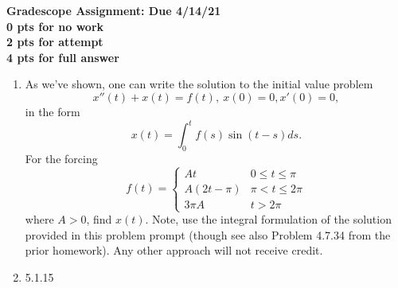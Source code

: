 \documentclass[a4paper,11pt]{article}
\newcommand{\ba}{\begin{array}}
\newcommand{\ea}{\end{array}}
\begin{document}
\begin{center}
{\bf Gradescope Assignment: Due 4/14/21\\
0 pts for no work\\ 2 pts for attempt\\ 4 pts for full answer}
\end{center}
\begin{enumerate}
\item As we've shown, one can write the solution to the initial value problem 
\[
x''(t) + x(t) = f(t), ~ x(0)=0, x'(0)=0,
\]
in the form
\[
x(t) = \int_{0}^{t}f(s)\sin(t-s)ds.
\]
For the forcing 
\[
f(t) = \left\{
\ba{rl}
At & 0\leq t \leq \pi \\
A(2t-\pi) & \pi < t \leq 2\pi\\
3\pi A & t > 2\pi
\ea
\right.
\]
where $A>0$, find $x(t)$.  Note, use the integral formulation of the solution provided in this problem prompt (though see also Problem 4.7.34 from the prior homework).  Any other approach will not receive credit. 
\item 5.1.15
\end{enumerate}
\end{document}
